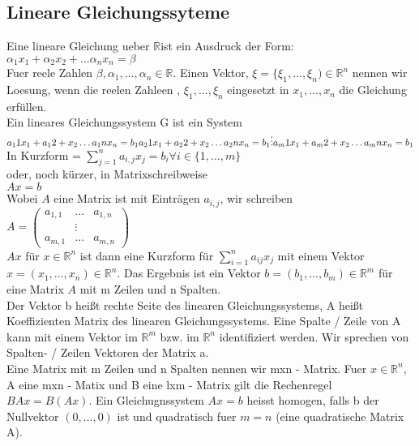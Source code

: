 \documentclass{scrartcl}
\newcommand{\R}{\mathbb{R}}
\newcommand{\mR}{\(\mathbb{R}\)}
\newcommand{\Rn}{\mathbb{R}^n}
\begin{document}
\subsection{Lineare Gleichungssyteme}
Eine lineare Gleichung ueber \mR ist ein Ausdruck der Form:\\
\(
\alpha_1x_1 + \alpha_2 x_2 + \dots \alpha_n x_n = \beta\)\\
Fuer reele Zahlen \(\beta, \alpha_1, \dots, \alpha_n \in \R\). Einen Vektor, \(\xi = \{\xi_1, \dots, \xi_n) \in \Rn\) nennen wir Loesung, wenn die reelen Zahleen  , \(\xi_1, \dots, \xi_n\) eingesetzt in \(x_1, \dots, x_n\) die Gleichung erf\"ullen.\\
Ein lineares Gleichungssystem G ist ein System \\
\(
a_11 x_1 + a_12 + x_2 \dots a_1n x_n = b_1\\
a_21 x_1 + a_22 + x_2 \dots a_2n x_n = b_1\\
\vdots\\
a_m1 x_1 + a_m2 + x_2 \dots a_mn x_n = b_1\\
\)\\
In Kurzform = \(\sum_{j=1}^n a_{i,j} x_j = b_i \forall i\in\{1,\dots,m\}\)\\
oder, noch k\"urzer, in Matrixschreibweise\\
\(Ax=b\)\\
Wobei \(A\) eine Matrix ist mit Eintr\"agen \(a_{i,j}\), wir schreiben\\
\(
A = 
\begin{pmatrix}
a_{1, 1} & \dots & a_{1, n}\\
 & \vdots\\
a_{m, 1} & \dots & a_{m, n}
\end{pmatrix}
\)\\
\(Ax\) f\"ur \(x \in \Rn\) ist dann eine Kurzform f\"ur \(\sum_{i=1}^na_{ij}x_j\) mit einem Vektor \(x = (x_1, \dots, x_n) \in \Rn\). Das Ergebnis ist ein Vektor \(b = (b_1, \dots, b_m) \in \R^m\) f\"ur eine Matrix \(A\) mit m Zeilen und n Spalten.\\
Der Vektor b hei\ss{}t rechte Seite des linearen Gleichungssystems, A hei\ss{}t Koeffizienten Matrix des linearen Gleichungssystems. Eine Spalte / Zeile von A kann mit einem Vektor im \(\R^m\) bzw. im \(\R^n\) identifiziert werden. Wir sprechen von Spalten- / Zeilen Vektoren der Matrix a.\\
Eine Matrix mit m Zeilen und n Spalten nennen wir mxn - Matrix. Fuer \(x  \in \Rn \), A eine mxn - Matix und B eine lxm - Matrix gilt die Rechenregel \(BAx = B(Ax)\). Ein Gleichugnssystem \(Ax=b\) heisst homogen, falls b der Nullvektor \((0, \dots, 0)\) ist und quadratisch fuer \(m = n\) (eine quadratische Matrix A).\\
\end{document}
